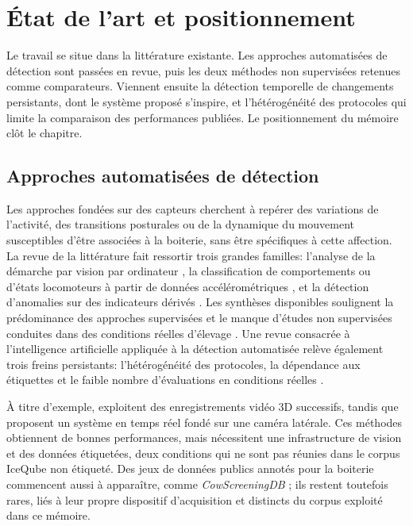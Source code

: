 \chapter{État de l'art et positionnement}
\label{chapitre:etatart}

Le travail se situe dans la littérature existante. Les approches automatisées de
détection sont passées en revue, puis les deux méthodes non supervisées retenues comme
comparateurs. Viennent ensuite la détection temporelle de changements persistants, dont le
système proposé s'inspire, et l'hétérogénéité des protocoles qui limite la comparaison des
performances publiées. Le positionnement du mémoire clôt le chapitre.

\section{Approches automatisées de détection}

Les approches fondées sur des capteurs cherchent à repérer des variations de l'activité, des
transitions posturales ou de la dynamique du mouvement susceptibles d'être associées à la
boiterie, sans être spécifiques à cette affection. La revue de la littérature fait ressortir
trois grandes familles: l'analyse de la démarche par vision par ordinateur
\citep{vanhertem2014evaluation,myint2024lameness}, la classification de comportements ou
d'états locomoteurs à partir de données accélérométriques
\citep{oleary2020accelerometers,alsaaod2019automatic,balasso2023behaviour,
benaissa2019calving,lavrova2023lameness}, et la détection d'anomalies sur des indicateurs
dérivés \citep{qiao2021review,chandola2009anomaly}. Les synthèses disponibles soulignent la
prédominance des approches supervisées et le manque d'études non supervisées conduites dans
des conditions réelles d'élevage \citep{qiao2021review,oleary2020accelerometers}. Une revue
consacrée à l'intelligence artificielle appliquée à la détection automatisée relève également
trois freins persistants: l'hétérogénéité des protocoles, la dépendance aux étiquettes et le
faible nombre d'évaluations en conditions réelles \citep{siachos2024automated}.

À titre d'exemple, \citet{vanhertem2014evaluation} exploitent des enregistrements vidéo 3D
successifs, tandis que \citet{myint2024lameness} proposent un système en temps réel fondé sur
une caméra latérale. Ces méthodes obtiennent de bonnes performances, mais nécessitent une
infrastructure de vision et des données étiquetées, deux conditions qui ne sont pas réunies
dans le corpus IceQube non étiqueté. Des jeux de données publics annotés pour la boiterie
commencent aussi à apparaître, comme \textit{CowScreeningDB}
\citep{ismail2024cowscreeningdb}; ils restent toutefois rares, liés à leur propre dispositif
d'acquisition et distincts du corpus exploité dans ce mémoire.

